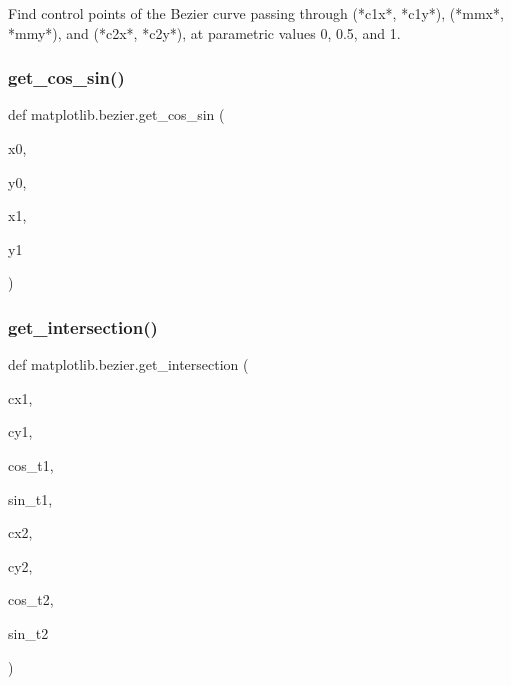 \begin{DoxyVerb}Find control points of the Bezier curve passing through (*c1x*, *c1y*),
(*mmx*, *mmy*), and (*c2x*, *c2y*), at parametric values 0, 0.5, and 1.
\end{DoxyVerb}
 \mbox{\label{namespacematplotlib_1_1bezier_affd32e87924de16dc65b98416ade9ae7}} 
\subsubsection{\texorpdfstring{get\+\_\+cos\+\_\+sin()}{get\_cos\_sin()}}
{\footnotesize\ttfamily def matplotlib.\+bezier.\+get\+\_\+cos\+\_\+sin (\begin{DoxyParamCaption}\item[{}]{x0,  }\item[{}]{y0,  }\item[{}]{x1,  }\item[{}]{y1 }\end{DoxyParamCaption})}

\mbox{\label{namespacematplotlib_1_1bezier_a6f3e6a2fff0ee2c27bf2dc87fdc511c7}} 
\subsubsection{\texorpdfstring{get\+\_\+intersection()}{get\_intersection()}}
{\footnotesize\ttfamily def matplotlib.\+bezier.\+get\+\_\+intersection (\begin{DoxyParamCaption}\item[{}]{cx1,  }\item[{}]{cy1,  }\item[{}]{cos\+\_\+t1,  }\item[{}]{sin\+\_\+t1,  }\item[{}]{cx2,  }\item[{}]{cy2,  }\item[{}]{cos\+\_\+t2,  }\item[{}]{sin\+\_\+t2 }\end{DoxyParamCaption})}

